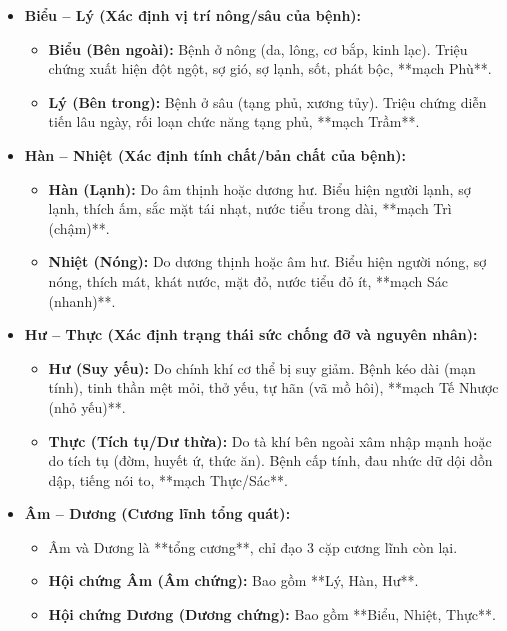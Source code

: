 \begin{itemize}
    \item \textbf{Biểu -- Lý (Xác định vị trí nông/sâu của bệnh):}
    \begin{itemize}
        \item \textbf{Biểu (Bên ngoài):} Bệnh ở nông (da, lông, cơ bắp, kinh lạc). Triệu chứng xuất hiện đột ngột, sợ gió, sợ lạnh, sốt, phát bộc, **mạch Phù**.
        \item \textbf{Lý (Bên trong):} Bệnh ở sâu (tạng phủ, xương tủy). Triệu chứng diễn tiến lâu ngày, rối loạn chức năng tạng phủ, **mạch Trầm**.
    \end{itemize}

    \item \textbf{Hàn -- Nhiệt (Xác định tính chất/bản chất của bệnh):}
    \begin{itemize}
        \item \textbf{Hàn (Lạnh):} Do âm thịnh hoặc dương hư. Biểu hiện người lạnh, sợ lạnh, thích ấm, sắc mặt tái nhạt, nước tiểu trong dài, **mạch Trì (chậm)**.
        \item \textbf{Nhiệt (Nóng):} Do dương thịnh hoặc âm hư. Biểu hiện người nóng, sợ nóng, thích mát, khát nước, mặt đỏ, nước tiểu đỏ ít, **mạch Sác (nhanh)**.
    \end{itemize}

    \item \textbf{Hư -- Thực (Xác định trạng thái sức chống đỡ và nguyên nhân):}
    \begin{itemize}
        \item \textbf{Hư (Suy yếu):} Do chính khí cơ thể bị suy giảm. Bệnh kéo dài (mạn tính), tinh thần mệt mỏi, thở yếu, tự hãn (vã mồ hôi), **mạch Tế Nhược (nhỏ yếu)**.
        \item \textbf{Thực (Tích tụ/Dư thừa):} Do tà khí bên ngoài xâm nhập mạnh hoặc do tích tụ (đờm, huyết ứ, thức ăn). Bệnh cấp tính, đau nhức dữ dội dồn dập, tiếng nói to, **mạch Thực/Sác**.
    \end{itemize}

    \item \textbf{Âm -- Dương (Cương lĩnh tổng quát):}
    \begin{itemize}
        \item Âm và Dương là **tổng cương**, chỉ đạo 3 cặp cương lĩnh còn lại.
        \item \textbf{Hội chứng Âm (Âm chứng):} Bao gồm **Lý, Hàn, Hư**.
        \item \textbf{Hội chứng Dương (Dương chứng):} Bao gồm **Biểu, Nhiệt, Thực**.
    \end{itemize}
\end{itemize}

